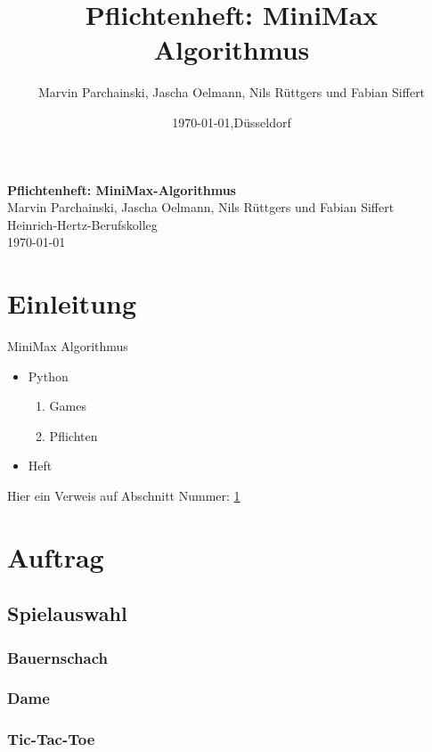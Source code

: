 \documentclass[12pt]{scrartcl}
\title{Pflichtenheft: MiniMax Algorithmus}
\author{Marvin Parchainski, Jascha Oelmann, Nils Rüttgers und Fabian Siffert}
\date{\today{},Düsseldorf}
\begin{document}
\begin{titlepage}
    \begin{center}
    \textbf{
    \Huge{Pflichtenheft: MiniMax-Algorithmus}\\[15cm]
    }
    \Large{Marvin Parchainski, Jascha Oelmann, Nils Rüttgers und Fabian Siffert}\\[1cm]
    \large{Heinrich-Hertz-Berufskolleg\\{\today}}
    \end{center}
\end{titlepage}
\thispagestyle{empty}

 
\newpage

\tableofcontents
\thispagestyle{empty}

\newpage

\section{Einleitung}
\label{sec:einleitung}

MiniMax Algorithmus

\begin{itemize}
    \item Python
    \begin{enumerate}
        \item Games
        \item Pflichten
    \end{enumerate}
    \item Heft
\end{itemize}



Hier ein Verweis auf Abschnitt Nummer: \ref{sec:einleitung}

\section{Auftrag}
\subsection{Spielauswahl}
\subsubsection{Bauernschach}
\subsubsection{Dame}
\subsubsection{Tic-Tac-Toe}
\end{document}
